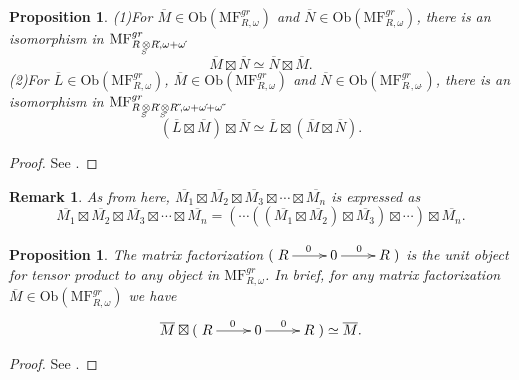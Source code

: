 \documentclass[10pt]{amsart}
\theoremstyle{break}
\newtheorem{pro}[de]{Proposition}
\newtheorem{rem}[de]{Remark}
\begin{document}
\begin{pro}\label{com-ass}
{\rm (1)}For $\overline{M} \in {{\mathrm{Ob}}}({{\mathrm{MF}}}^{gr}_{R,\omega})$ and $\overline{N} \in {{\mathrm{Ob}}}({{\mathrm{MF}}}^{gr}_{R\acute{},\omega\acute{}})$, 
there is an isomorphism in ${{\mathrm{MF}}}^{gr}_{R{{\,\otimes\hspace{-0.7em}\raisebox{-0.5ex}{${}_{{}_{S}}$}\,}} R\acute{},\omega + \omega \acute{}}$
$$\overline{M}\boxtimes \overline{N} \simeq \overline{N}\boxtimes \overline{M}.$$ 
{\rm (2)}For $\overline{L} \in {{\mathrm{Ob}}}({{\mathrm{MF}}}^{gr}_{R,\omega})$, $\overline{M} \in {{\mathrm{Ob}}}({{\mathrm{MF}}}^{gr}_{R\acute{},\omega\acute{}})$ 
and $\overline{N} \in {{\mathrm{Ob}}}({{\mathrm{MF}}}^{gr}_{R \acute{}\,\acute{},\omega \acute{}\,\acute{}})$, 
there is an isomorphism in ${{\mathrm{MF}}}^{gr}_{R{{\,\otimes\hspace{-0.7em}\raisebox{-0.5ex}{${}_{{}_{S}}$}\,}} R\acute{}{{\,\otimes\hspace{-0.7em}\raisebox{-0.5ex}{${}_{{}_{S\acute{}}}$}\,}} R \acute{}\,\acute{},\omega + \omega\acute{} +\omega \acute{}\,\acute{}}$ 
$$(\overline{L}\boxtimes \overline{M})\boxtimes \overline{N} \simeq \overline{L}\boxtimes (\overline{M}\boxtimes \overline{N}).$$ 
\end{pro}
\begin{proof}
See \cite{Yone1}.
\end{proof}
\begin{rem}
As from here, $\overline{M_1}\boxtimes\overline{M_2}\boxtimes\overline{M_3}\boxtimes\cdots\boxtimes\overline{M_n}$ is expressed as
\begin{equation*}
\overline{M_1}\boxtimes\overline{M_2}\boxtimes\overline{M_3}\boxtimes\cdots\boxtimes\overline{M_n}
=(\cdots((\overline{M_1}\boxtimes\overline{M_2})\boxtimes\overline{M_3})\boxtimes\cdots)\boxtimes\overline{M_n}.
\end{equation*}
\end{rem}
\begin{pro}\label{identity}
The matrix factorization $(\xymatrix{R \ar[r]^0&0\ar[r]^0&R})$ is the unit object for tensor product to any object in ${{\mathrm{MF}}}^{gr}_{R,\omega}$. In brief, 
for any matrix factorization $\overline{M} \in {{\mathrm{Ob}}}({{\mathrm{MF}}}^{gr}_{R,\omega})$ we have
$$
\overline{M} \boxtimes (\xymatrix{R \ar[r]^0&0\ar[r]^0&R}) \simeq \overline{M}.
$$
\end{pro}

\begin{proof}
See \cite{Yone1}.
\end{proof}
\end{document}
